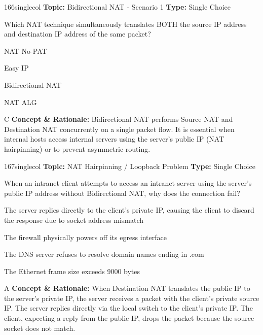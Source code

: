 \begin{qcard}{166}{singlecol}
\textcolor{darkslate!75}{\small\textbf{Topic:} Bidirectional NAT - Scenario 1 \hfill \textbf{Type:} Single Choice}\vspace{0.4em}\par
Which NAT technique simultaneously translates BOTH the source IP address and destination IP address of the same packet?
\begin{qoptions}
\item NAT No-PAT
\item Easy IP
\item Bidirectional NAT
\item NAT ALG
\end{qoptions}
\end{qcard}
\nopagebreak
\begin{explainbox}{C}
\textbf{Concept \& Rationale:} Bidirectional NAT performs Source NAT and Destination NAT concurrently on a single packet flow. It is essential when internal hosts access internal servers using the server's public IP (NAT hairpinning) or to prevent asymmetric routing.
\end{explainbox}

\begin{qcard}{167}{singlecol}
\textcolor{darkslate!75}{\small\textbf{Topic:} NAT Hairpinning / Loopback Problem \hfill \textbf{Type:} Single Choice}\vspace{0.4em}\par
When an intranet client attempts to access an intranet server using the server's public IP address without Bidirectional NAT, why does the connection fail?
\begin{qoptions}
\item The server replies directly to the client's private IP, causing the client to discard the response due to socket address mismatch
\item The firewall physically powers off its egress interface
\item The DNS server refuses to resolve domain names ending in .com
\item The Ethernet frame size exceeds 9000 bytes
\end{qoptions}
\end{qcard}
\nopagebreak
\begin{explainbox}{A}
\textbf{Concept \& Rationale:} When Destination NAT translates the public IP to the server's private IP, the server receives a packet with the client's private source IP. The server replies directly via the local switch to the client's private IP. The client, expecting a reply from the public IP, drops the packet because the source socket does not match.
\end{explainbox}

